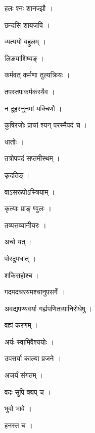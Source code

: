 \documentclass[10pt, openany]{book}
\begin{document}
\noindent हलः श्नः शानज्झौ ।

\noindent छन्दसि शायजपि ।

\noindent व्यत्ययो बहुलम् ।

\noindent लिङ्याशिष्यङ् ।

\noindent कर्मवत् कर्मणा तुल्यक्रियः ।

\noindent तपस्तपःकर्मकस्यैव ।

\noindent न दुहस्नुनमां यक्चिणौ ।

\noindent कुषिरजोः प्राचां श्यन् परस्मैपदं च ।

\noindent धातोः ।

\noindent तत्रोपपदं सप्तमीस्थम् ।

\noindent कृदतिङ् ।

\noindent वाऽसरूपोऽस्त्रियाम् ।

\noindent कृत्याः प्राङ् ण्वुलः ।

\noindent तव्यत्तव्यानीयरः ।

\noindent अचो यत् ।

\noindent पोरदुपधात् ।

\noindent शकिसहोश्च ।

\noindent गदमदचरयमश्चानुपसर्गे ।

\noindent अवद्यपण्यवर्या गर्ह्यपणितव्यानिरोधेषु ।

\noindent वह्यं करणम् ।

\noindent अर्यः स्वामिवैश्ययोः ।

\noindent उपसर्या काल्या प्रजने ।

\noindent अजर्यं संगतम् ।

\noindent वदः सुपि क्यप् च ।

\noindent भुवो भावे ।

\noindent हनस्त च ।
\end{document}
